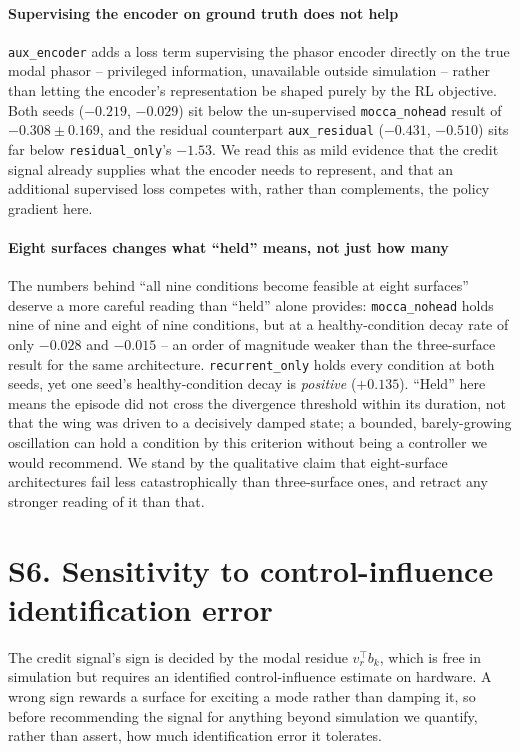 \documentclass[11pt]{article}
\begin{document}
\paragraph{Supervising the encoder on ground truth does not help}
\texttt{aux\_encoder} adds a loss term supervising the phasor encoder
directly on the true modal phasor -- privileged information, unavailable
outside simulation -- rather than letting the encoder's representation be
shaped purely by the RL objective. Both seeds ($-0.219$, $-0.029$) sit
below the un-supervised \texttt{mocca\_nohead} result of
$-0.308\pm0.169$, and the residual counterpart \texttt{aux\_residual}
($-0.431$, $-0.510$) sits far below \texttt{residual\_only}'s $-1.53$. We
read this as mild evidence that the credit signal already supplies what
the encoder needs to represent, and that an additional supervised loss
competes with, rather than complements, the policy gradient here.

\paragraph{Eight surfaces changes what ``held'' means, not just how many}
The numbers behind ``all nine conditions become feasible at eight
surfaces'' deserve a more careful reading than ``held'' alone provides:
\texttt{mocca\_nohead} holds nine of nine and eight of nine conditions, but
at a healthy-condition decay rate of only $-0.028$ and $-0.015$ -- an
order of magnitude weaker than the three-surface result for the same
architecture. \texttt{recurrent\_only} holds every condition at both
seeds, yet one seed's healthy-condition decay is \emph{positive}
($+0.135$). ``Held'' here means the episode did not cross the divergence
threshold within its duration, not that the wing was driven to a
decisively damped state; a bounded, barely-growing oscillation can hold a
condition by this criterion without being a controller we would
recommend. We stand by the qualitative claim that eight-surface
architectures fail less catastrophically than three-surface ones, and
retract any stronger reading of it than that.

\section*{S6. Sensitivity to control-influence identification error}
\label{sec:s6}

The credit signal's sign is decided by the modal residue $v_r^{\top} b_k$,
which is free in simulation but requires an identified control-influence
estimate on hardware. A wrong sign rewards a surface for exciting a mode
rather than damping it, so before recommending the signal for anything
beyond simulation we quantify, rather than assert, how much
identification error it tolerates.
\end{document}
